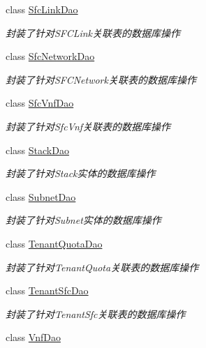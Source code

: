 \begin{DoxyCompactItemize}
class \mbox{\hyperlink{interfacecom_1_1example_1_1demo_1_1dao_1_1_sfc_link_dao}{Sfc\+Link\+Dao}}
\begin{DoxyCompactList}\small\item\em 封装了针对\+S\+F\+C\+Link关联表的数据库操作 \end{DoxyCompactList}\item 
class \mbox{\hyperlink{interfacecom_1_1example_1_1demo_1_1dao_1_1_sfc_network_dao}{Sfc\+Network\+Dao}}
\begin{DoxyCompactList}\small\item\em 封装了针对\+S\+F\+C\+Network关联表的数据库操作 \end{DoxyCompactList}\item 
class \mbox{\hyperlink{interfacecom_1_1example_1_1demo_1_1dao_1_1_sfc_vnf_dao}{Sfc\+Vnf\+Dao}}
\begin{DoxyCompactList}\small\item\em 封装了针对\+Sfc\+Vnf关联表的数据库操作 \end{DoxyCompactList}\item 
class \mbox{\hyperlink{interfacecom_1_1example_1_1demo_1_1dao_1_1_stack_dao}{Stack\+Dao}}
\begin{DoxyCompactList}\small\item\em 封装了针对\+Stack实体的数据库操作 \end{DoxyCompactList}\item 
class \mbox{\hyperlink{interfacecom_1_1example_1_1demo_1_1dao_1_1_subnet_dao}{Subnet\+Dao}}
\begin{DoxyCompactList}\small\item\em 封装了针对\+Subnet实体的数据库操作 \end{DoxyCompactList}\item 
class \mbox{\hyperlink{interfacecom_1_1example_1_1demo_1_1dao_1_1_tenant_quota_dao}{Tenant\+Quota\+Dao}}
\begin{DoxyCompactList}\small\item\em 封装了针对\+Tenant\+Quota关联表的数据库操作 \end{DoxyCompactList}\item 
class \mbox{\hyperlink{interfacecom_1_1example_1_1demo_1_1dao_1_1_tenant_sfc_dao}{Tenant\+Sfc\+Dao}}
\begin{DoxyCompactList}\small\item\em 封装了针对\+Tenant\+Sfc关联表的数据库操作 \end{DoxyCompactList}\item 
class \mbox{\hyperlink{interfacecom_1_1example_1_1demo_1_1dao_1_1_vnf_dao}{Vnf\+Dao}}

\end{DoxyCompactItemize}

